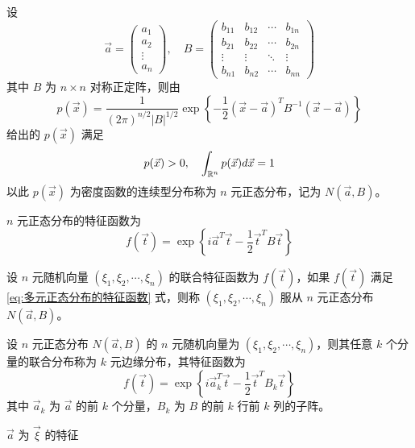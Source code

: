 \documentclass[12pt,a4paper]{amsart}
\begin{document}
\begin{definition}[多元正态分布]
    设
    \begin{equation}
        \vec{a} = \begin{pmatrix} a_1 \\ a_2 \\ \vdots \\ a_n \end{pmatrix}, \quad B = \begin{pmatrix} b_{11} & b_{12} & \cdots & b_{1n} \\ b_{21} & b_{22} & \cdots & b_{2n} \\ \vdots & \vdots & \ddots & \vdots \\ b_{n1} & b_{n2} & \cdots & b_{nn} \end{pmatrix}
    \end{equation}
    其中 $B$ 为 $n\times n$ 对称正定阵，则由
    \begin{equation}
        p(\vec{x}) = \frac{1}{(2\pi)^{n/2} |B|^{1/2}} \exp\left\{-\frac{1}{2} (\vec{x}-\vec{a})^T B^{-1} (\vec{x}-\vec{a})\right\}
    \end{equation}
    给出的 $p(\vec{x})$ 满足
    \begin{equation}
        p(\vec{x}) > 0, \quad \int_{\mathbb{R}^n}p(\vec{x}) d\vec{x} = 1
    \end{equation}
    以此 $p(\vec{x})$ 为密度函数的连续型分布称为 $n$ 元正态分布，记为 $N(\vec{a}, B)$。
\end{definition}

\begin{proposition}
    $n$ 元正态分布的特征函数为
    \begin{equation}\label{eq:多元正态分布的特征函数}
        f(\vec{t}) = \exp\left\{i\vec{a}^T\vec{t} - \frac{1}{2} \vec{t}^T B \vec{t}\right\}
    \end{equation}
\end{proposition}

\begin{definition}[多元正态分布的特征函数定义]
    设 $n$ 元随机向量 $(\xi_1, \xi_2, \cdots, \xi_n)$ 的联合特征函数为 $f(\vec{t})$，如果 $f(\vec{t})$ 满足 \ref{eq:多元正态分布的特征函数} 式，则称 $(\xi_1, \xi_2, \cdots, \xi_n)$ 服从 $n$ 元正态分布 $N(\vec{a}, B)$。
\end{definition}

\begin{proposition}[边缘分布]
    设 $n$ 元正态分布 $N(\vec{a}, B)$ 的 $n$ 元随机向量为 $(\xi_1, \xi_2, \cdots, \xi_n)$，则其任意 $k$ 个分量的联合分布称为 $k$ 元边缘分布，其特征函数为
    \begin{equation}
        f(\vec{t}) = \exp\left\{i\vec{a}_k^T\vec{t} - \frac{1}{2} \vec{t}^T B_k \vec{t}\right\}
    \end{equation}
    其中 $\vec{a}_k$ 为 $\vec{a}$ 的前 $k$ 个分量，$B_k$ 为 $B$ 的前 $k$ 行前 $k$ 列的子阵。
\end{proposition}

\begin{proposition}[数字特征]
    $\vec{a}$ 为 $\vec{\xi}$ 的特征
\end{proposition}

\appendix


{\footnotesize}
\end{document}
